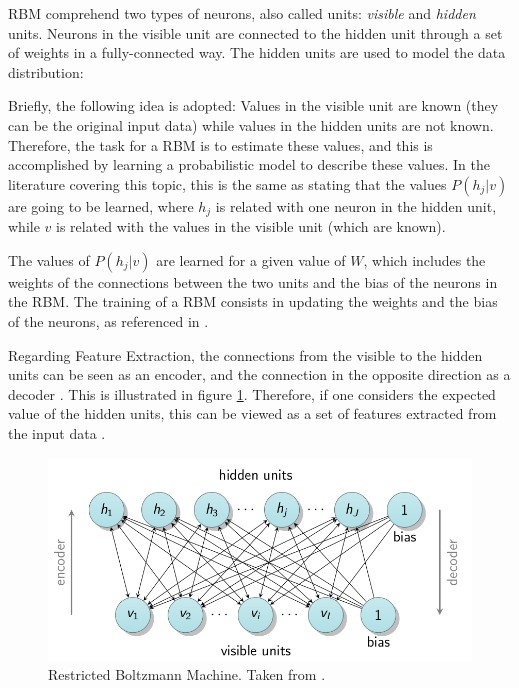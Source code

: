 \documentclass[9pt,journal,compsoc]{IEEEtran}
\begin{document}
RBM comprehend two types of neurons, also called units: \emph{visible} and \emph{hidden} units. Neurons in the visible unit are connected to the hidden unit through a set of weights in a fully-connected way. The hidden units are used to model the data distribution:

Briefly, the following idea is adopted: Values in the visible unit are known (they can be the original input data) while values in the hidden units are not known. Therefore, the task for a RBM is to estimate these values, and this is accomplished by learning a probabilistic model to describe these values. In the literature covering this topic, this is the same as stating that the values $P(h_{j} | v)$ are going to be learned, where $h_{j}$ is related with one neuron in the hidden unit, while $v$ is related with the values in the visible unit (which are known).

The values of $P(h_{j} | v)$ are learned for a given value of $W$, which includes the weights of the connections between the two units and the bias of the neurons in the RBM. The training of a RBM consists in updating the weights and the bias of the neurons, as referenced in \cite{cai2012feature}.

Regarding Feature Extraction, the connections from the visible to the hidden units can be seen as an encoder, and the connection in the opposite direction as a decoder \cite{ribeiro2017deep}. This is illustrated in figure \ref{restricted_boltzmann_machines}. Therefore, if one considers the expected value of the hidden units, this can be viewed as a set of features extracted from the input data \cite{cai2012feature}.

\begin{figure}[ht]
	\centering
	\includegraphics[scale=0.25]{restricted_boltzmann_machine.png}
	\caption{Restricted Boltzmann Machine. Taken from \cite{ribeiro2017deep}.}
	\label{restricted_boltzmann_machines}
\end{figure}
\end{document}
